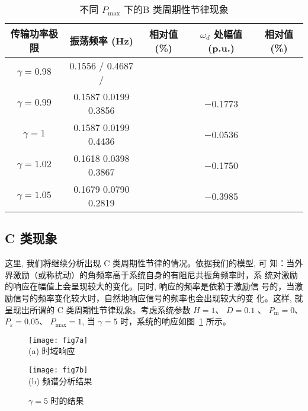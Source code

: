 \documentclass[withoutpreface,bwprint]{cumcmthesis} %
\begin{document}
\begin{table}[h!t]
    \center
    \caption{不同 $P_{\max}$ 下的B 类周期性节律现象}
    \renewcommand\arraystretch{0.9}
    \begin{tabular}{c|c|c|c|c}
    \hline
    传输功率极限  & 振荡频率 (Hz) & 相对值 (\%) & $\omega_{d}$ 处幅值 (p.u.) &  相对值 (\%) \\
    \hline $\gamma=0.98$ & 0.1556 / 0.4687 / & & \\
\hline $\gamma=0.99$ & 0.1587 0.0199 0.3856 & & $-$0.1773 \\
\hline $\gamma=1$ & 0.1587 0.0199 0.4436 & & $-$0.0536 \\
\hline $\gamma=1.02$ & 0.1618 0.0398 0.3867 & & $-$0.1750 \\
\hline $\gamma=1.05$ & 0.1679 0.0790 0.2819 & & $-$0.3985 \\
        \hline
    \end{tabular}
     \label{tab3}
    \end{table}

\subsection{C 类现象}
\label{sec5-4}

这里, 我们将继续分析出现 $ \mathrm{C} $ 类周期性节律的情况。依据我们的模型, 可 知：当外界激励（或称扰动）的角频率高于系统自身的有阻尼共振角频率时，系 统对激励的响应在幅值上会呈现较大的变化。同时, 响应的频率是依赖于激励信 号的，当激励信号的频率变化较大时，自然地响应信号的频率也会出现较大的变 化。这样, 就呈现出所谓的 $ \mathrm{C} $ 类周期性节律现象。考虑系统参数 $ H=1 $、 $D=0.1$  、  $P_{\mathrm{m}}=0 $、 $P_{\varepsilon}=0.05 $、 $P_{\max }=1 $, 当  $\gamma=5 $ 时，系统的响应如图~\ref{fig12} 所示。

\begin{figure}[h!t]
\begin{minipage}{0.48\linewidth}
  \centering
  {
  \texttt{[image: fig7a]}\\
  (a) 时域响应
  }
\end{minipage}\hfill
\begin{minipage}{0.48\linewidth}
  \centering
  {
  \texttt{[image: fig7b]}\\
  (b) 频谱分析结果
  }
\end{minipage}
    \caption{$\gamma=5$ 时的结果}
    \label{fig12}
\end{figure}
\end{document}
